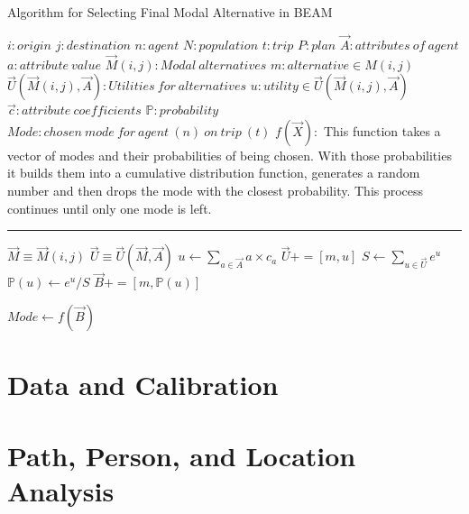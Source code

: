 \documentclass[12pt, oneside, openright]{byuthesis}
\begin{document}
\begin{algorithm}
\caption{Algorithm for Selecting Final Modal Alternative in BEAM}
\begin{algorithmic}[1]
\Require
\State $i : origin$
\State $j : destination$
\State $n: agent$
\State $N: population$
\State $t : trip $
\State $P : plan$
\State $\vec{A}: attributes\:of\:agent$
\State $a: attribute\:value$
\State $\vec{M}(i,j) : Modal\:alternatives$
\State $m : alternative \in M(i,j)$
\State $\vec{U}(\vec{M}(i,j),\vec{A}):Utilities\:for\:alternatives$
\State $u: utility \in \vec{U}(\vec{M}(i,j),\vec{A})$
\State $\vec{c}: attribute\:coefficients$
\State $\mathds{P}: probability$
\State $Mode: chosen\:mode\:for\:agent\:(n)\:on\:trip\:(t)$
\State $f(\vec{X}):$
This function takes a vector of modes and  their probabilities of being chosen. With those probabilities it builds them into a cumulative distribution function, generates a random number and then drops the mode with the closest probability. This process continues until only one mode is left.
\vspace{4pt}\hrule\vspace{5pt}

\State $\vec{M} \equiv \vec{M}(i,j)$
\State $\vec{U} \equiv \vec{U}(\vec{M},\vec{A})$
  \State $u \gets \sum_{a\in \vec{A}} a \times c_a$
  \State $\vec{U} += [m,u]$
\EndFor
\State $S \gets \sum_{u\in \vec{U}}e^u$
    \State $\mathds{P}(u)\gets e^u / S$
    \State $\vec{B} +=[m, \mathds{P}(u)]$
\EndFor 

\State $Mode \gets f(\vec{B})$

\EndProcedure

\EndFor
\EndFor
\Statex
\end{algorithmic}
\end{algorithm}

\hypertarget{data-and-calibration}{%
\section{Data and Calibration}\label{data-and-calibration}}

\hypertarget{path-person-and-location-analysis}{%
\section{Path, Person, and Location Analysis}\label{path-person-and-location-analysis}}
\end{document}
